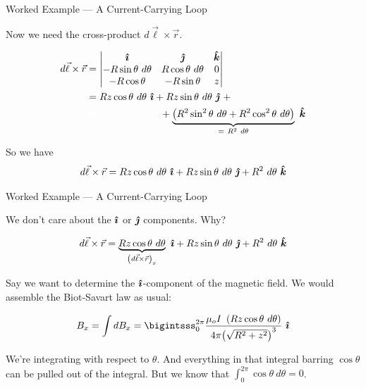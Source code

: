 \documentclass{beamer}
\begin{document}
\begin{frame}{Worked Example --- A Current-Carrying Loop}

Now we need the cross-product $d\vec{\ell} \times \vec{r}$.

\begin{align*}
    d\vec{\ell} \times \vec{r} &= \begin{vmatrix} \ihat & \jhat & \khat \\ -R\sin{\theta}\ d\theta & R\cos{\theta}\ d\theta & 0 \\ -R\cos{\theta} & -R\sin{\theta} & z \end{vmatrix} \\
                               &= Rz\cos{\theta}\ d\theta\ \ihat + Rz\sin{\theta}\ d\theta\ \jhat\ + \\
                               &\textcolor{white}{white}\qquad\qquad\quad + \underbrace{\left( R^2 \sin^2{\theta}\ d\theta + R^2\cos^2{\theta}\ d\theta \right)}_{=\ R^2\ d\theta}\ \khat
\end{align*}

So we have
\begin{equation*}
    d\vec{\ell} \times \vec{r} = Rz\cos{\theta}\ d\theta\ \ihat + Rz\sin{\theta}\ d\theta\ \jhat + R^2\ d\theta\ \khat
\end{equation*}

\end{frame}

\begin{frame}{Worked Example --- A Current-Carrying Loop}

We don't care about the $\bm{\hat{\imath}}$ or $\bm{\hat{\jmath}}$ components. Why?

\begin{equation*}
    d\vec{\ell} \times \vec{r} = \underbrace{Rz\cos{\theta}\ d\theta}_{\left( d\vec{\ell} \times \vec{r} \right)_x}\ \ihat + Rz\sin{\theta}\ d\theta\ \jhat + R^2\ d\theta\ \khat
\end{equation*}

\vfill

Say we want to determine the $\bm{\hat{\imath}}$-component of the magnetic field. We would assemble the Biot-Savart law as usual:

\begin{equation*}
    B_x = \int dB_x = \bigintsss_{0}^{2\pi} \frac{\mu_o I\ \left( Rz\cos{\theta}\ d\theta \right)}{4\pi {\left( \sqrt{R^2 + z^2} \right)^3}}\ \ihat
\end{equation*}

We're integrating with respect to $\theta$. And everything in that integral barring $\cos{\theta}$ can be pulled out of the integral. But we know that $\displaystyle \int_{0}^{2\pi} \cos{\theta}\ d\theta = 0$.

\end{frame}
\end{document}
